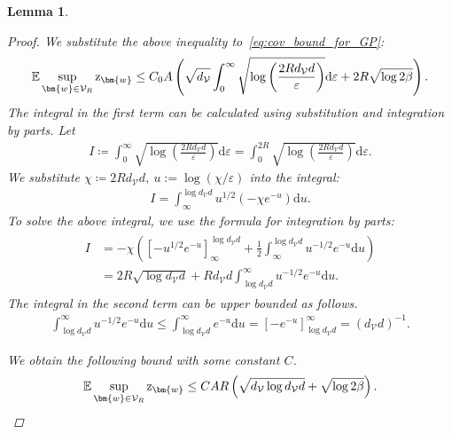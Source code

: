 \documentclass{article}
\def\rz{{\textnormal{z}}}
\theoremstyle{plain}
\newtheorem{lemma}[theorem]{Lemma}
\theoremstyle{definition}
\theoremstyle{remark}
\begin{document}
\begin{lemma}
\begin{proof}
We substitute the above inequality to~\cref{eq:cov_bound_for_GP}:
\begin{align*}
    \mathbb{E}\sup_{\bm{w} \in \mathcal{V}_R} \rz_{\bm{w}}\leq  C_0A\left( \sqrt{d_{\mathcal{V}}}\int^{\infty}_0 \sqrt{\log \left(\frac{2Rd_{\mathcal{V}}d}{\varepsilon}\right)} \mathrm{d}\varepsilon + 2R \sqrt{\log 2\beta} \right).
\end{align*}
The integral in the first term can be calculated using substitution and integration by parts. Let
\begin{align*}
I \coloneqq \int^{\infty}_0 \sqrt{\log \left(\frac{2Rd_{\mathcal{V}}d}{\varepsilon}\right)} \mathrm{d}\varepsilon = \int^{2R}_0 \sqrt{\log \left(\frac{2Rd_{\mathcal{V}}d}{\varepsilon}\right)} \mathrm{d}\varepsilon.
\end{align*}
We substitute \(\chi \coloneqq 2Rd_{\mathcal{V}}d,\ u := \log (\chi/\varepsilon)\) into the integral:
\begin{align*}
    I = \int_{\infty}^{\log d_{\mathcal{V}}d} u^{1/2}(-\chi e^{-u})\mathrm{d}u.
\end{align*}
To solve the above integral, we use the formula for integration by parts:
\begin{align*}
    \begin{aligned}
    I &= -\chi \left([-u^{1/2}e^{-u}]^{\log d_{\mathcal{V}}d}_{\infty} + \frac{1}{2} \int^{\log d_{\mathcal{V}}d}_{\infty} u^{-1/2}e^{-u}\mathrm{d}u \right) \\
    &= 2R \sqrt{\log d_{\mathcal{V}}d} + Rd_{\mathcal{V}}d \int^{\infty}_{\log d_{\mathcal{V}}d} u^{-1/2}e^{-u}\mathrm{d}u.
    \end{aligned}
\end{align*}
The integral in the second term can be upper bounded as follows.
\begin{align*}
    \int^{\infty}_{\log d_{\mathcal{V}}d} u^{-1/2}e^{-u}\mathrm{d}u \leq \int^{\infty}_{\log d_{\mathcal{V}}d} e^{-u}\mathrm{d}u = [-e^{-u}]^{\infty}_{\log d_{\mathcal{V}}d} = (d_{\mathcal{V}}d)^{-1}.
\end{align*}

We obtain the following bound with some constant \(C\). 
\begin{align*}
    \mathbb{E}\sup_{\bm{w} \in \mathcal{V}_R} \rz_{\bm{w}}\leq C A R \left( \sqrt{d_{\mathcal{V}}\log d_{\mathcal{V}}d} + \sqrt{\log 2\beta} \right).
\end{align*}
\end{proof}
\end{lemma}
\end{document}
